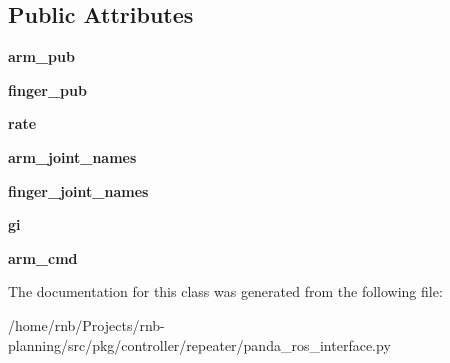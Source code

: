 \subsection*{Public Attributes}
\begin{DoxyCompactItemize}
\item 
\mbox{\label{classrnb-planning_1_1src_1_1pkg_1_1controller_1_1repeater_1_1panda__ros__interface_1_1_panda_control_publisher_a3d5bff0ba9aff032d9d6bd23ae79ab29}} 
{\bfseries arm\+\_\+pub}
\item 
\mbox{\label{classrnb-planning_1_1src_1_1pkg_1_1controller_1_1repeater_1_1panda__ros__interface_1_1_panda_control_publisher_adb218a82e7c8b3a514e7d8e64574b728}} 
{\bfseries finger\+\_\+pub}
\item 
\mbox{\label{classrnb-planning_1_1src_1_1pkg_1_1controller_1_1repeater_1_1panda__ros__interface_1_1_panda_control_publisher_a4a96974a8e537fb96d315b3de5e5d56b}} 
{\bfseries rate}
\item 
\mbox{\label{classrnb-planning_1_1src_1_1pkg_1_1controller_1_1repeater_1_1panda__ros__interface_1_1_panda_control_publisher_abd2923cad0cd2170f176176c61e8a218}} 
{\bfseries arm\+\_\+joint\+\_\+names}
\item 
\mbox{\label{classrnb-planning_1_1src_1_1pkg_1_1controller_1_1repeater_1_1panda__ros__interface_1_1_panda_control_publisher_a7a2709b0068734fb7ab25bae98afc2a9}} 
{\bfseries finger\+\_\+joint\+\_\+names}
\item 
\mbox{\label{classrnb-planning_1_1src_1_1pkg_1_1controller_1_1repeater_1_1panda__ros__interface_1_1_panda_control_publisher_a159c6d9d5f3aac0ee0700be2c548648a}} 
{\bfseries gi}
\item 
\mbox{\label{classrnb-planning_1_1src_1_1pkg_1_1controller_1_1repeater_1_1panda__ros__interface_1_1_panda_control_publisher_ab4493d08aff90911d40179b9d6e1a69b}} 
{\bfseries arm\+\_\+cmd}
\end{DoxyCompactItemize}


The documentation for this class was generated from the following file\+:\begin{DoxyCompactItemize}
\item 
/home/rnb/\+Projects/rnb-\/planning/src/pkg/controller/repeater/panda\+\_\+ros\+\_\+interface.\+py\end{DoxyCompactItemize}
